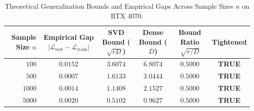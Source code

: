 \documentclass[journal]{IEEEtran}
\begin{document}
\begin{table}[h]
\centering
\caption{Theoretical Generalization Bounds and Empirical Gaps Across Sample Sizes $n$ on RTX 4070.}
\label{tab:generalization_bounds}
\begin{tabular}{rccccc}
\toprule
\textbf{Sample Size} $n$ & \textbf{Empirical Gap} $|\mathcal{L}_{\text{test}} - \mathcal{L}_{\text{train}}|$ & \textbf{SVD Bound} ($\sqrt{rD}$) & \textbf{Dense Bound} ($D$) & \textbf{Bound Ratio} $\sqrt{r/D}$ & \textbf{Tightened} \\
\midrule
$100$ & $0.0152$ & $3.6074$ & $6.8074$ & $0.5000$ & \textbf{TRUE} \\
$500$ & $0.0007$ & $1.6133$ & $3.0444$ & $0.5000$ & \textbf{TRUE} \\
$1000$ & $0.0014$ & $1.1408$ & $2.1527$ & $0.5000$ & \textbf{TRUE} \\
$5000$ & $0.0020$ & $0.5102$ & $0.9627$ & $0.5000$ & \textbf{TRUE} \\
\bottomrule
\end{tabular}
\end{table}
\end{document}

